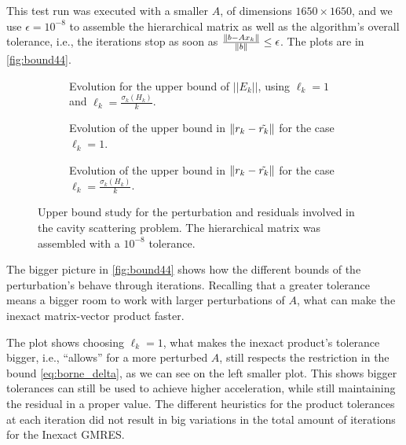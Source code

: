 
This test run was executed with a smaller $A$, of dimensions $1650\times 1650$, and we use $\epsilon = 10^{-8}$ to assemble the hierarchical matrix as well as the algorithm's overall tolerance, i.e., the iterations stop as soon as $\frac{\left\lVert b - Ax_{k}\right\rVert}{\left\lVert b\right\rVert} \leq \epsilon$. The plots are in \autoref{fig:bound44}.

\begin{figure}[h!]
    \centering
    \begin{subfigure}[b]{0.6\linewidth}
        
        \caption{Evolution for the upper bound of $||E_{k}||$, using $\ell_{k}=1$ and $\ell_{k}=\frac{\sigma_{k}(H_{k})}{k}$.}
    \end{subfigure}

    \begin{subfigure}[b]{0.4\linewidth}
        
        \caption{Evolution of the upper bound in $\left\lVert r_{k} - \tilde{r_{k}}\right\rVert$ for the case $\ell_{k}=1$.}
    \end{subfigure}
    \begin{subfigure}[b]{0.4\linewidth}
        
        \caption{Evolution of the upper bound in $\left\lVert r_{k} - \tilde{r_{k}}\right\rVert$ for the case $\ell_{k}=\frac{\sigma_{k}(H_{k})}{k}$.}
    \end{subfigure}
    \caption{Upper bound study for the perturbation and residuals involved in the cavity scattering problem. The hierarchical matrix was assembled with a $10^{-8}$ tolerance.}
    \label{fig:bound44}
\end{figure}

The bigger picture in \autoref{fig:bound44} shows how the different bounds of the perturbation's behave through iterations. Recalling that a greater tolerance means a bigger room to work with larger perturbations of $A$, what can make the inexact matrix-vector product faster.

The plot shows choosing $\ell_{k} = 1$, what makes the inexact product's tolerance bigger, i.e., “allows” for a more perturbed $A$, still respects the restriction in the bound \ref{eq:borne_delta}, as we can see on the left smaller plot. This shows bigger tolerances can still be used to achieve higher acceleration, while still maintaining the residual in a proper value. The different heuristics for the product tolerances at each iteration did not result in big variations in the total amount of iterations for the Inexact GMRES.

